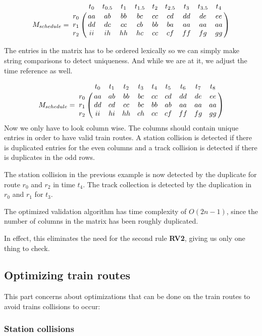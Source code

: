 \documentclass[10pt,a4paper]{article}
\let\bbordermatrix\bordermatrix
\begin{document}
\begin{equation}
M_{schedule} = \bbordermatrix{
                    ~ & t_0 & t_{0.5} & t_1 & t_{1.5} & t_2 & t_{2.5} & t_3 & t_{3.5} & t_4 \cr
                  r_0 & aa  &  ab     & bb  &  bc     & cc  &  cd     & dd  & de      & ee\cr
                  r_1 & dd  &  dc     & cc  &  cb     & bb  &  ba     & aa  & aa      & aa\cr
                  r_2 & ii  &  ih     & hh  &  hc     & cc  &  cf     & ff  & fg      & gg}
\label{eq:sched2}
\end{equation}

The entries in the matrix has to be ordered lexically so we can simply make string comparisons to detect uniqueness. And while we are at it, we adjust the time reference as well.

\begin{equation}
M_{schedule} = \bbordermatrix{
                    ~ & t_0 & t_1 & t_2 & t_3 & t_4 & t_5 & t_6 & t_7 & t_8 \cr
                  r_0 & aa  & ab  & bb  & bc  & cc  & cd  & dd  & de  & ee\cr
                  r_1 & dd  & cd  & cc  & bc  & bb  & ab  & aa  & aa  & aa\cr
                  r_2 & ii  & hi  & hh  & ch  & cc  & cf  & ff  & fg  & gg}
\label{eq:sched3}
\end{equation} 
Now we only have to look column wise. The columns should contain unique entries in order to have valid train routes.
A station collision is detected if there is duplicated entries for the even columns and a track collision is detected if there is duplicates in the odd rows.
 
The station collision in the previous example is now detected by the duplicate for route $r_0$ and $r_2$ in time $t_4$.
The track collection is detected by the duplication in $r_0$ and $r_1$ for $t_3$.
 
The optimized validation algorithm has time complexity of $O(2n-1)$, since the number of columns in the matrix has been roughly duplicated.

In effect, this eliminates the need for the second rule \textbf{RV2}, giving us only one thing to check.

\subsection{Optimizing train routes}
 
This part concerns about optimizations that can be done on the train routes to avoid trains collisions to occur:
 
\subsubsection{Station collisions}
 
\end{document}
